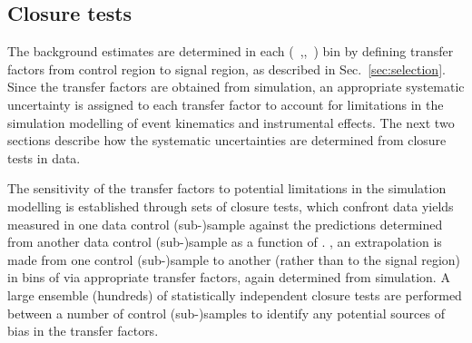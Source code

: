 %

\subsection{Closure tests}
\label{sec:closure-tests-desc}
\label{sec:bkgdnorm-syst}

The background estimates are determined in each (\nb~,\njet,~\scalht) bin by
defining transfer factors from control region to signal region, as
described in Sec.~\ref{sec:selection}. Since the transfer factors
are obtained from simulation, an appropriate systematic uncertainty is
assigned to each transfer factor to account for limitations in the
simulation modelling of event kinematics and instrumental effects. The
next two sections describe how the systematic uncertainties are
determined from closure tests in data.

The sensitivity of the transfer factors to potential limitations in
the simulation modelling is established through sets of closure tests,
which confront data yields measured in one data control (sub-)sample
against the predictions determined from another data control
(sub-)sample as a function of \scalht. \ie, an extrapolation is made
from one control (sub-)sample to another (rather than to the signal
region) in bins of \scalht via appropriate transfer factors, again
determined from simulation. A large ensemble (\ie hundreds) of
statistically independent closure tests are performed between a number
of control (sub-)samples to identify any potential sources of bias in
the transfer factors.

